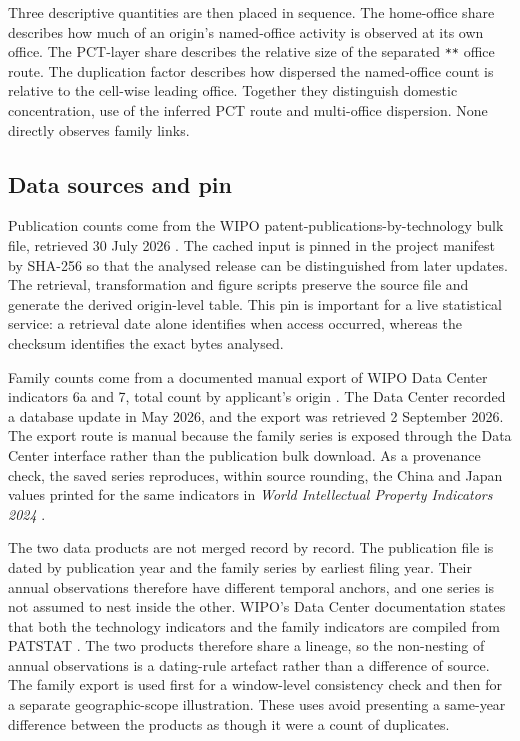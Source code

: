 \documentclass[a4paper,fleqn]{cas-dc}
\begin{document}
Three descriptive quantities are then placed in sequence. The home-office
share describes how much of an origin's named-office activity is observed at
its own office. The PCT-layer share describes the relative size of the
separated \texttt{**} office route. The duplication factor describes how
dispersed the named-office count is relative to the cell-wise leading office.
Together they distinguish domestic concentration, use of the inferred PCT
route and multi-office dispersion. None directly observes family links.

\subsection{Data sources and pin}\label{sec:sources}

Publication counts come from the WIPO patent-publications-by-technology bulk
file, retrieved 30 July 2026 \citep{wipo2025bulk}. The cached input is pinned
in the project manifest by SHA-256 so that the analysed release can be
distinguished from later updates. The retrieval, transformation and figure
scripts preserve the source file and generate the derived origin-level table.
This pin is important for a live statistical service: a retrieval date alone
identifies when access occurred, whereas the checksum identifies the exact
bytes analysed.

Family counts come from a documented manual export of WIPO Data Center
indicators 6a and 7, total count by applicant's origin
\citep{wipo2026families}. The Data Center recorded a database update in May
2026, and the export was retrieved 2 September 2026. The export route is
manual because the family series is exposed through the Data Center interface
rather than the publication bulk download. As a provenance check, the saved
series reproduces, within source rounding, the China and Japan values printed
for the same indicators in \emph{World Intellectual Property Indicators 2024}
\citep{wipo2024wipi}.

The two data products are not merged record by record. The publication file is
dated by publication year and the family series by earliest filing year.
Their annual observations therefore have different temporal anchors, and one
series is not assumed to nest inside the other. WIPO's Data Center
documentation states that both the technology indicators and the family
indicators are compiled from PATSTAT \citep{wipoabout}. The two products
therefore share a lineage, so the non-nesting of annual observations is a
dating-rule artefact rather than a difference of source. The family export is
used first for a window-level consistency check and then for a separate
geographic-scope illustration. These uses avoid presenting a same-year
difference between the products as though it were a count of duplicates.
\end{document}
